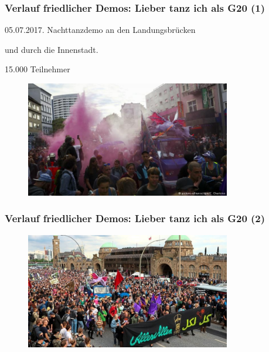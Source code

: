 \documentclass[]{beamer}
\begin{document}
	\begin{frame}
	\frametitle{Verlauf friedlicher Demos: Lieber tanz ich als G20 (1)}
		05.07.2017. Nachttanzdemo an den Landungsbrücken\par
		und durch die Innenstadt.\par
		15.000 Teilnehmer
	\begin{figure}
		\renewcommand{\figurename}{Foto} 
		\includegraphics[width=0.8\textwidth]{images/lieber-tanz-ich-als-g20-1}
		\caption{}
	\end{figure}
\end{frame}

	\begin{frame}
	\frametitle{Verlauf friedlicher Demos: Lieber tanz ich als G20 (2)}
	\begin{figure}
		\renewcommand{\figurename}{Foto} 
		\includegraphics[width=0.8\textwidth]{images/lieber-tanz-ich-als-g20-2}
		\caption{}
	\end{figure}
\end{frame}
\end{document}
